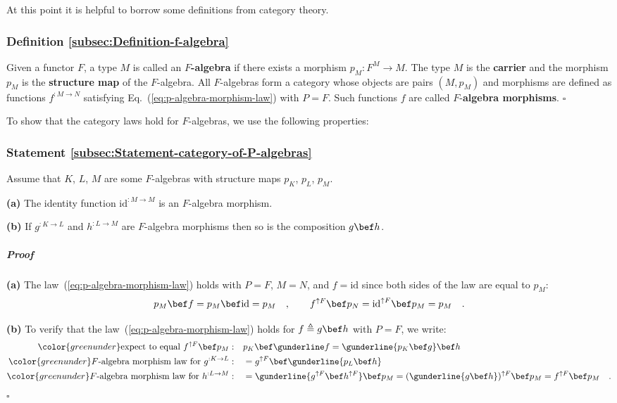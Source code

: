At this point it is helpful to borrow some definitions from category
theory. 

\subsubsection{Definition \label{subsec:Definition-f-algebra}\ref{subsec:Definition-f-algebra}}

Given a functor $F$, a type $M$ is called an $F$\textbf{-algebra}
if there exists a morphism $p_{M}:F^{M}\rightarrow M$. The type $M$
is the \textbf{carrier} and the morphism $p_{M}$ is the \textbf{structure
map} of the $F$-algebra.  All $F$-algebras
form a category whose objects are pairs $\left(M,p_{M}\right)$ and
morphisms are defined as functions $f^{:M\rightarrow N}$ satisfying
Eq.~(\ref{eq:p-algebra-morphism-law}) with $P=F$. Such functions
$f$ are called $F$-\textbf{algebra morphisms}.
$\square$

To show that the category laws hold for $F$-algebras, we use the
following properties:

\subsubsection{Statement \label{subsec:Statement-category-of-P-algebras}\ref{subsec:Statement-category-of-P-algebras}}

Assume that $K$, $L$, $M$ are some $F$-algebras with structure
maps $p_{K}$, $p_{L}$, $p_{M}$.

\textbf{(a)} The identity function $\text{id}^{:M\rightarrow M}$
is an $F$-algebra morphism.

\textbf{(b)} If $g^{:K\rightarrow L}$ and $h^{:L\rightarrow M}$
are $F$-algebra morphisms then so is the composition $g\bef h$.

\subparagraph{Proof}

\textbf{(a)} The law~(\ref{eq:p-algebra-morphism-law}) holds with
$P=F$, $M=N$, and $f=\text{id}$ since both sides of the law are
equal to $p_{M}$:
\[
p_{M}\bef f=p_{M}\bef\text{id}=p_{M}\quad,\quad\quad f^{\uparrow F}\bef p_{N}=\text{id}^{\uparrow F}\bef p_{M}=p_{M}\quad.
\]

\textbf{(b)} To verify that the law~(\ref{eq:p-algebra-morphism-law})
holds for $f\triangleq g\bef h$ with $P=F$, we write:
\begin{align*}
{\color{greenunder}\text{expect to equal }f^{\uparrow F}\bef p_{M}:}\quad & p_{K}\bef\gunderline f=\gunderline{p_{K}\bef g}\bef h\\
{\color{greenunder}F\text{-algebra morphism law for }g^{:K\rightarrow L}:}\quad & =g^{\uparrow F}\bef\gunderline{p_{L}\bef h}\\
{\color{greenunder}F\text{-algebra morphism law for }h^{:L\rightarrow M}:}\quad & =\gunderline{g^{\uparrow F}\bef h^{\uparrow F}}\bef p_{M}=(\gunderline{g\bef h})^{\uparrow F}\bef p_{M}=f^{\uparrow F}\bef p_{M}\quad.
\end{align*}
$\square$

